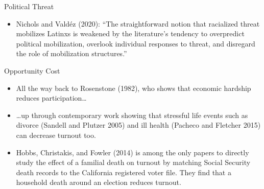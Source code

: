 \documentclass[
  ignorenonframetext,
  aspectratio=169]{beamer}
\providecommand{\tightlist}{%
  \setlength{\itemsep}{0pt}\setlength{\parskip}{0pt}}
\begin{document}
\begin{frame}{Political Threat}
\protect\hypertarget{political-threat-1}{}
\begin{itemize}[<+->]
\tightlist
\item
  Nichols and Valdéz (2020): ``The straightforward notion that
  racialized threat mobilizes Latinxs is weakened by the literature's
  tendency to overpredict political mobilization, overlook individual
  responses to threat, and disregard the role of mobilization
  structures.''
\end{itemize}
\end{frame}

\begin{frame}{Opportunity Cost}
\protect\hypertarget{opportunity-cost}{}
\begin{itemize}[<+->]
\tightlist
\item
  All the way back to Rosenstone (1982), who shows that economic
  hardship reduces participation\ldots{}
\end{itemize}

\begin{itemize}[<+->]
\tightlist
\item
  \ldots up through contemporary work showing that stressful life events
  such as divorce (Sandell and Plutzer 2005) and ill health (Pacheco and
  Fletcher 2015) can decrease turnout too.
\end{itemize}

\begin{itemize}[<+->]
\tightlist
\item
  Hobbs, Christakis, and Fowler (2014) is among the only papers to
  directly study the effect of a familial death on turnout by matching
  Social Security death records to the California registered voter file.
  They find that a household death around an election reduces turnout.
\end{itemize}
\end{frame}
\end{document}
